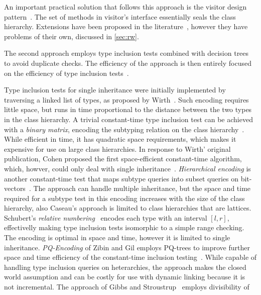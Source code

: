 An important practical solution that follows this approach is the visitor design 
pattern~\cite{DesignPatterns1993}. The set of  methods in visitor's 
interface essentially seals the class hierarchy. Extensions have been proposed 
in the literature~\cite{Zenger:2001}, however they have problems of their own, 
discussed in \textsection\ref{sec:rw}.

The second approach employs type inclusion tests combined with decision 
trees~\cite{Cardelli84} to avoid duplicate checks. The efficiency of the 
approach is then entirely focused on the efficiency of type inclusion 
tests~\cite{Schubert83,Wirth88,Cohen91,Caseau93,Vortex96,Krall97nearoptimal,Vitek97,PQEncoding,FastDynCast,Ducournau08}.

Type inclusion tests for single inheritance were initially implemented by 
traversing a linked list of types, as proposed by Wirth~\cite{Wirth88}. Such 
encoding requires little space, but runs in time proportional to the distance 
between the two types in the class hierarchy. A trivial constant-time type 
inclusion test can be achieved with a \emph{binary matrix}, encoding the 
subtyping relation on the class hierarchy~\cite{Vortex96}. While efficient in 
time, it has quadratic space requirements, which makes it expensive for use on 
large class hierarchies. In response to Wirth' original publication, Cohen 
proposed the first space-efficient constant-time algorithm, which, howver, could 
only deal with single inheritance~\cite{Cohen91}. \emph{Hierarchical encoding} 
is another constant-time test that maps subtype queries into subset queries on 
bit-vectors~\cite{Caseau93,Krall97nearoptimal}. The approach can handle multiple
inheritance, but the space and time required for a subtype test in this encoding 
increases with the size of the class hierarchy, also Caseau's approach is 
limited to class hierarchies that are lattices. Schubert's \emph{relative 
numbering}~\cite{Schubert83} encodes each type with an interval $[l,r]$, 
effectivelly making type inclusion tests isomorphic to a simple range checking. 
The encoding is optimal in space and time, however it is limited to single 
inheritance. \emph{PQ-Encoding} of Zibin and Gil employs PQ-trees to improve 
further space and time efficiency of the constant-time inclusion 
testing~\cite{PQEncoding}. While capable of handling type inclusion queries on 
heterarchies, the approach makes the closed world assumption and can be costly 
for use with dynamic linking because it is not incremental.
The approach of Gibbs and Stroustrup~\cite{FastDynCast} employs divisibility of 
